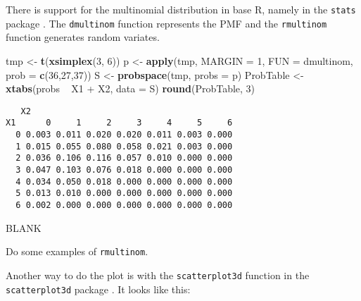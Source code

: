 \documentclass[]{book}
\newenvironment{Shaded}{\begin{snugshade}}{\end{snugshade}}
\newcommand{\KeywordTok}[1]{\textcolor[rgb]{0.13,0.29,0.53}{\textbf{{#1}}}}
\newcommand{\DataTypeTok}[1]{\textcolor[rgb]{0.13,0.29,0.53}{{#1}}}
\newcommand{\DecValTok}[1]{\textcolor[rgb]{0.00,0.00,0.81}{{#1}}}
\newcommand{\StringTok}[1]{\textcolor[rgb]{0.31,0.60,0.02}{{#1}}}
\newcommand{\NormalTok}[1]{{#1}}
\numberwithin{equation}{chapter}
\numberwithin{figure}{chapter}
\theoremstyle{plain}
\theoremstyle{definition}
\theoremstyle{remark}
\theoremstyle{definition}
\theoremstyle{definition}
\theoremstyle{remark}
\begin{document}
There is support for the multinomial distribution in base R, namely in
the \texttt{stats} package \autocite{stats}. The \texttt{dmultinom}
function represents the PMF and the \texttt{rmultinom} function
generates random variates.

\begin{Shaded}
\begin{Highlighting}[]
\NormalTok{tmp <-}\StringTok{ }\KeywordTok{t}\NormalTok{(}\KeywordTok{xsimplex}\NormalTok{(}\DecValTok{3}\NormalTok{, }\DecValTok{6}\NormalTok{))}
\NormalTok{p <-}\StringTok{ }\KeywordTok{apply}\NormalTok{(tmp, }\DataTypeTok{MARGIN =} \DecValTok{1}\NormalTok{, }\DataTypeTok{FUN =} \NormalTok{dmultinom, }\DataTypeTok{prob =} \KeywordTok{c}\NormalTok{(}\DecValTok{36}\NormalTok{,}\DecValTok{27}\NormalTok{,}\DecValTok{37}\NormalTok{))}
\NormalTok{S <-}\StringTok{ }\KeywordTok{probspace}\NormalTok{(tmp, }\DataTypeTok{probs =} \NormalTok{p)}
\NormalTok{ProbTable <-}\StringTok{ }\KeywordTok{xtabs}\NormalTok{(probs ~}\StringTok{ }\NormalTok{X1 +}\StringTok{ }\NormalTok{X2, }\DataTypeTok{data =} \NormalTok{S)}
\KeywordTok{round}\NormalTok{(ProbTable, }\DecValTok{3}\NormalTok{)}
\end{Highlighting}
\end{Shaded}

\begin{verbatim}
   X2
X1      0     1     2     3     4     5     6
  0 0.003 0.011 0.020 0.020 0.011 0.003 0.000
  1 0.015 0.055 0.080 0.058 0.021 0.003 0.000
  2 0.036 0.106 0.116 0.057 0.010 0.000 0.000
  3 0.047 0.103 0.076 0.018 0.000 0.000 0.000
  4 0.034 0.050 0.018 0.000 0.000 0.000 0.000
  5 0.013 0.010 0.000 0.000 0.000 0.000 0.000
  6 0.002 0.000 0.000 0.000 0.000 0.000 0.000
\end{verbatim}

BLANK

Do some examples of \texttt{rmultinom}.

Another way to do the plot is with the \texttt{scatterplot3d} function
in the \texttt{scatterplot3d} package \autocite{scatterplot3d}. It looks
like this:
\end{document}
